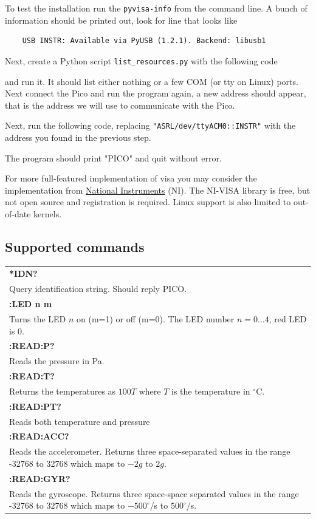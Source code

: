 \documentclass{article}
\newcommand{\ls}[1]{\lstinline{#1}}
\begin{document}
To test the installation run the \ls{pyvisa-info} from the command line. A bunch of information should be printed out, look for line that looks like
\begin{lstlisting}
    USB INSTR: Available via PyUSB (1.2.1). Backend: libusb1
\end{lstlisting}

Next, create a Python script \ls{list_resources.py} with the following code

and run it. It should list either nothing or a few COM (or tty on Linux) ports. Next connect the Pico and run the program again, a new address should appear, that is the address we will use to communicate with the Pico.

Next, run the following code, replacing \ls{"ASRL/dev/ttyACM0::INSTR"} with the address you found in the previous step.

The program should print "PICO" and quit without error.

For more full-featured implementation of visa you may consider the implementation from \href{https://www.ni.com/en/support/downloads/drivers/download.ni-visa.html#548367}{National Instruments} (NI). The NI-VISA library is free, but not open source and registration is required. Linux support is also limited to out-of-date kernels.

\subsection{Supported commands}
\begin{tabular}{p{15cm}}
    \textbf{*IDN?}\\
    Query identification string. Should reply PICO.
    \\\hline
    \textbf{:LED n m}\\
    Turns the LED $n$ on (m=1) or off (m=0). The LED number $n = 0 \dots 4$, red LED is 0.
    \\\hline
    \textbf{:READ:P?}\\
    Reads the pressure in Pa.
    \\\hline
    \textbf{:READ:T?}\\
    Returns the temperatures as $100T$ where $T$ is the temperature in $^\circ$C.
    \\\hline
    \textbf{:READ:PT?}\\
    Reads both temperature and pressure
    \\\hline
    \textbf{:READ:ACC?}\\
    Reads the accelerometer. Returns three space-separated values in the range -32768 to 32768 which maps to $-2g$ to $2g$.
    \\\hline
    \textbf{:READ:GYR?}\\
    Reads the gyroscope. Returns three space-space separated values in the range -32768 to 32768 which maps to $-500^\circ$/s to $500^\circ$/s.
\end{tabular}
\end{document}
